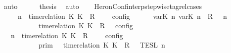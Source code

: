 \begin{isabellebody}
\ auto\isanewline
\ \ \ \ \isamarkupfalse%
\ {\isacharquery}thesis\ \isamarkupfalse%
\ auto\isanewline
\ \ \isamarkupfalse%
\isanewline
{}\isamarkupfalse%
%
\endisatagproof
{\isafoldproof}%
%
\isadelimproof
\isanewline
%
\endisadelimproof
\isanewline
{}\isamarkupfalse%
\ HeronConf{\isacharunderscore}interp{\isacharunderscore}stepwise{\isacharunderscore}tagrel{\isacharunderscore}cases{\isacharcolon}\isanewline
\ \ \ {\isacartoucheopen}{\isasymlbrakk}\ {\isasymGamma}{\isacharcomma}\ n\ {\isasymturnstile}\ {\isacharparenleft}{\isacharparenleft}time{\isacharminus}relation\ {\isasymlfloor}K\ K\ {\isasymin}\ R{\isacharparenright}\ {\isacharhash}\ {\isasymPsi}{\isacharparenright}\ {\isasymtriangleright}\ {\isasymPhi}\ {\isasymrbrakk}\isactrlsub c\isactrlsub o\isactrlsub n\isactrlsub f\isactrlsub i\isactrlsub g\isanewline
\ \ \ \ {\isacharequal}\ {\isasymlbrakk}\ {\isacharparenleft}{\isacharparenleft}{\isasymlfloor}{\isasymtau}\isactrlsub v\isactrlsub a\isactrlsub r{\isacharparenleft}K\ n{\isacharparenright}{\isacharcomma}\ {\isasymtau}\isactrlsub v\isactrlsub a\isactrlsub r{\isacharparenleft}K\ n{\isacharparenright}{\isasymrfloor}\ {\isasymin}\ R{\isacharparenright}\ {\isacharhash}\ {\isasymGamma}{\isacharparenright}{\isacharcomma}\ n\isanewline
\ \ \ \ \ \ \ \ {\isasymturnstile}\ {\isasymPsi}\ {\isasymtriangleright}\ {\isacharparenleft}{\isacharparenleft}time{\isacharminus}relation\ {\isasymlfloor}K\ K\ {\isasymin}\ R{\isacharparenright}\ {\isacharhash}\ {\isasymPhi}{\isacharparenright}\ {\isasymrbrakk}\isactrlsub c\isactrlsub o\isactrlsub n\isactrlsub f\isactrlsub i\isactrlsub g{\isacartoucheclose}\isanewline
%
\isadelimproof
%
\endisadelimproof
%
\isatagproof
{}\isamarkupfalse%
\ {\isacharminus}\isanewline
\ \ \isamarkupfalse%
\ {\isacartoucheopen}{\isasymlbrakk}\ {\isasymGamma}{\isacharcomma}\ n\ {\isasymturnstile}\ {\isacharparenleft}time{\isacharminus}relation\ {\isasymlfloor}K\ K\ {\isasymin}\ R{\isacharparenright}\ {\isacharhash}\ {\isasymPsi}\ {\isasymtriangleright}\ {\isasymPhi}\ {\isasymrbrakk}\isactrlsub c\isactrlsub o\isactrlsub n\isactrlsub f\isactrlsub i\isactrlsub g\isanewline
\ \ \ \ \ \ \ \ {\isacharequal}\ {\isasymlbrakk}{\isasymlbrakk}\ {\isasymGamma}\ {\isasymrbrakk}{\isasymrbrakk}\isactrlsub p\isactrlsub r\isactrlsub i\isactrlsub m\ {\isasyminter}\ {\isasymlbrakk}{\isasymlbrakk}\ {\isacharparenleft}time{\isacharminus}relation\ {\isasymlfloor}K\ K\ {\isasymin}\ R{\isacharparenright}\ {\isacharhash}\ {\isasymPsi}\ {\isasymrbrakk}{\isasymrbrakk}\isactrlsub T\isactrlsub E\isactrlsub S\isactrlsub L\isactrlbsup {\isasymge}\ n\isactrlesup \isanewline

\end{isabellebody}
